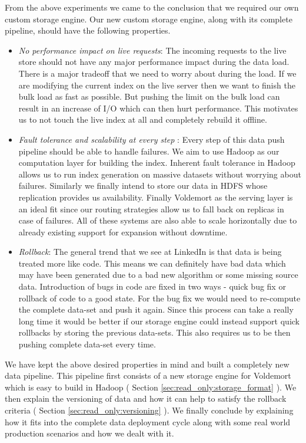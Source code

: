 \documentclass[10pt,twocolumn,preprint,natbib,authoryear]{sigplanconf}
\begin{document}
From the above experiments we came to the conclusion that we required our own custom storage engine. Our new custom storage engine, along with its complete pipeline, should have the following properties. 
\begin{itemize}
\item \emph {No performance impact on live requests}: The incoming requests to the live store should not have any major performance impact during the data load. There is a major tradeoff that we need to worry about during the load. If we are modifying the current index on the live server then we want to finish the bulk load as fast as possible. But pushing the limit on the bulk load can result in an increase of I/O which can then hurt performance. This motivates us to not touch the live index at all and completely rebuild it offline. 
\item \emph {Fault tolerance and scalability at every step }: Every step of this data push pipeline should be able to handle failures. We aim to use Hadoop as our computation layer for building the index. Inherent fault tolerance in Hadoop allows us to run index generation on massive datasets without worrying about failures. Similarly we finally intend to store our data in HDFS whose replication provides us availability. Finally Voldemort as the serving layer is an ideal fit since our routing strategies allow us to fall back on replicas in case of failures. All of these systems are also able to scale horizontally due to already existing support for expansion without downtime. 
\item \emph{Rollback}: The general trend that we see at LinkedIn is that data is being treated more like code. This means we can definitely have bad data which may have been generated due to a bad new algorithm or some missing source data. Introduction of bugs in code are fixed in two ways - quick bug fix or rollback of code to a good state. For the bug fix we would need to re-compute the complete data-set and push it again. Since this process can take a really long time it would be better if our storage engine could instead support quick rollbacks by storing the previous data-sets. This also requires us to be then pushing complete data-set every time. 
\end{itemize}

We have kept the above desired properties in mind and built a completely new data pipeline. This pipeline first consists of a new storage engine for Voldemort which is easy to build in Hadoop ( Section \ref{sec:read_only:storage_format} ). We then explain the versioning of data and how it can help to satisfy the rollback criteria ( Section \ref{sec:read_only:versioning} ). We finally conclude by explaining how it fits into the complete data deployment cycle along with some real world production scenarios and how we dealt with it. 
\end{document}
